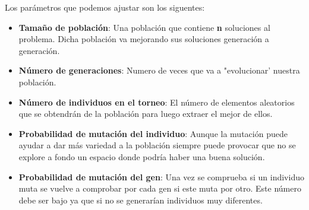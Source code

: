 Los parámetros que podemos ajustar son los siguentes:

\begin{itemize}

	\item \textbf{Tamaño de población}: Una población que contiene \textbf{n} soluciones al problema. Dicha población va mejorando sus soluciones generación a generación.
	\item \textbf{Número de generaciones}: Numero de veces que va a "evolucionar' nuestra población.
	\item \textbf{Número de individuos en el torneo}: El número de elementos aleatorios que se obtendrán de la población para luego extraer el mejor de ellos. 
	\item \textbf{Probabilidad de mutación del individuo}: Aunque la mutación puede ayudar a dar más variedad a la población siempre puede provocar que no se explore a fondo un espacio donde podría haber una buena solución.
	\item \textbf{Probabilidad de mutación del gen}: Una vez se comprueba si un individuo muta se vuelve a comprobar por cada gen si este muta por otro. Este número debe ser bajo ya que si no se generarían individuos muy diferentes.
\end{itemize}


